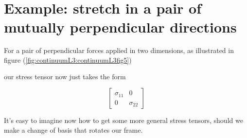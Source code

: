 \section{Example: stretch in a pair of mutually perpendicular directions}

For a pair of perpendicular forces applied in two dimensions, as illustrated in figure (\ref{fig:continuumL3:continuumL3fig5})

our stress tensor now just takes the form

\begin{equation}\label{eqn:continuumL3:390}
\begin{bmatrix}
\sigma_{11} & 0 \\
0 & \sigma_{22}
\end{bmatrix}
\end{equation}

It's easy to imagine now how to get some more general stress tensors, should we make a change of basis that rotates our frame.

